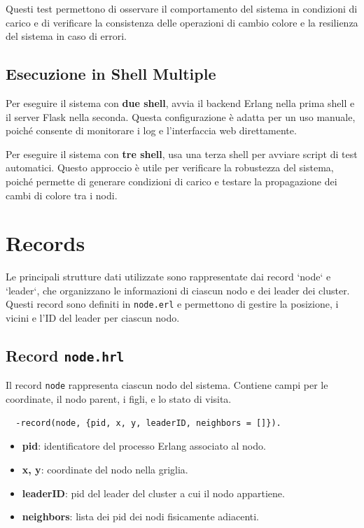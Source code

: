 \documentclass[12pt, a4paper]{report}
\begin{document}
\noindent Questi test permettono di osservare il comportamento del sistema in condizioni di carico e di verificare la consistenza delle operazioni di cambio colore e la resilienza del sistema in caso di errori.

\subsection{Esecuzione in Shell Multiple}
Per eseguire il sistema con \textbf{due shell}, avvia il backend Erlang nella prima shell e il server Flask nella seconda. Questa configurazione è adatta per un uso manuale, poiché consente di monitorare i log e l’interfaccia web direttamente.

Per eseguire il sistema con \textbf{tre shell}, usa una terza shell per avviare script di test automatici. Questo approccio è utile per verificare la robustezza del sistema, poiché permette di generare condizioni di carico e testare la propagazione dei cambi di colore tra i nodi.






\section{Records}

Le principali strutture dati utilizzate sono rappresentate dai record `node` e `leader`, che organizzano le informazioni di ciascun nodo e dei leader dei cluster. Questi record sono definiti in \texttt{node.erl} e permettono di gestire la posizione, i vicini e l'ID del leader per ciascun nodo.

\subsection{Record \texttt{node.hrl}}

Il record \texttt{node} rappresenta ciascun nodo del sistema. Contiene campi per le coordinate, il nodo parent, i figli, e lo stato di visita.

\begin{tcolorbox}[title=Definizione del record \texttt{node}]
\begin{verbatim}
  -record(node, {pid, x, y, leaderID, neighbors = []}).
\end{verbatim}
\end{tcolorbox}

\begin{itemize}
    \item \textbf{pid}: identificatore del processo Erlang associato al nodo.
    \item \textbf{x, y}: coordinate del nodo nella griglia.
    \item \textbf{leaderID}: pid del leader del cluster a cui il nodo appartiene.
    \item \textbf{neighbors}: lista dei pid dei nodi fisicamente adiacenti.
\end{itemize}
\end{document}
